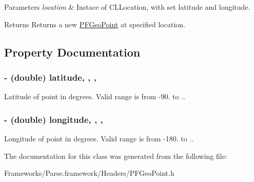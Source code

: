 \begin{DoxyParams}{Parameters}
{\em location} & Instace of {\ttfamily C\+L\+Location}, with set latitude and longitude.\\
\hline
\end{DoxyParams}
\begin{DoxyReturn}{Returns}
Returns a new \hyperlink{interface_p_f_geo_point}{P\+F\+Geo\+Point} at specified location. 
\end{DoxyReturn}


\subsection{Property Documentation}
\hypertarget{interface_p_f_geo_point_a22e8251519dbea12e2fd195b6726e025}{}
\subsubsection[{latitude}]{\setlength{\rightskip}{0pt plus 5cm}-\/ (double) latitude\hspace{0.3cm}{\ttfamily [read]}, {\ttfamily [write]}, {\ttfamily [nonatomic]}, {\ttfamily [assign]}}\label{interface_p_f_geo_point_a22e8251519dbea12e2fd195b6726e025}




 





Latitude of point in degrees. Valid range is from {\ttfamily -\/90.} to {.}. \hypertarget{interface_p_f_geo_point_ae18b7781d731f421f3feeafd9c99be8b}{}
\subsubsection[{longitude}]{\setlength{\rightskip}{0pt plus 5cm}-\/ (double) longitude\hspace{0.3cm}{\ttfamily [read]}, {\ttfamily [write]}, {\ttfamily [nonatomic]}, {\ttfamily [assign]}}\label{interface_p_f_geo_point_ae18b7781d731f421f3feeafd9c99be8b}
Longitude of point in degrees. Valid range is from {\ttfamily -\/180.} to {.}. 

The documentation for this class was generated from the following file\+:\begin{DoxyCompactItemize}
\item 
Frameworks/\+Parse.\+framework/\+Headers/P\+F\+Geo\+Point.\+h\end{DoxyCompactItemize}
